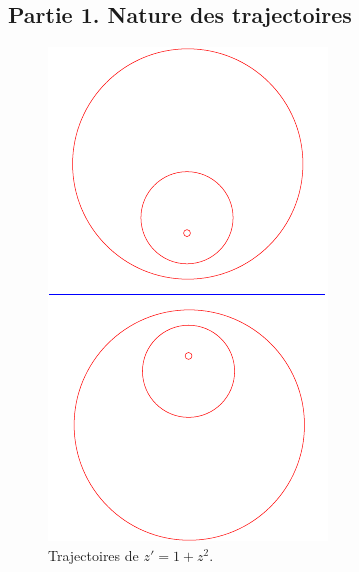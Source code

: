 \subsection*{Partie 1. Nature des trajectoires}
\begin{figure}
 \centering
 \includegraphics{Cricatti_1.pdf}
 \caption{Trajectoires de $z'=1+z^2$.}
 \label{fig:Cricatti_1}
\end{figure}
